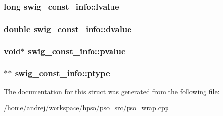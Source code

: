 \hypertarget{structswig__const__info_f142e4c21ad4fe61f6c2624bff034583}{
\subsubsection{\setlength{\rightskip}{0pt plus 5cm}long {\bf swig\_\-const\_\-info::lvalue}}}
\label{structswig__const__info_f142e4c21ad4fe61f6c2624bff034583}


\hypertarget{structswig__const__info_74e477f1dbf515bcb7e2ef07a1d34c35}{
\subsubsection{\setlength{\rightskip}{0pt plus 5cm}double {\bf swig\_\-const\_\-info::dvalue}}}
\label{structswig__const__info_74e477f1dbf515bcb7e2ef07a1d34c35}


\hypertarget{structswig__const__info_bbc43512c364bff11fac5961c1155090}{
\subsubsection{\setlength{\rightskip}{0pt plus 5cm}void$\ast$ {\bf swig\_\-const\_\-info::pvalue}}}
\label{structswig__const__info_bbc43512c364bff11fac5961c1155090}


\hypertarget{structswig__const__info_edd46d173c5b5ed4ee60ad5660233557}{
\subsubsection{$\ast$$\ast$ {\bf swig\_\-const\_\-info::ptype}}}
\label{structswig__const__info_edd46d173c5b5ed4ee60ad5660233557}




The documentation for this struct was generated from the following file:\begin{CompactItemize}
\item 
/home/andrej/workspace/hpso/pso\_\-src/\hyperlink{pso__wrap_8cpp}{pso\_\-wrap.cpp}\end{CompactItemize}
